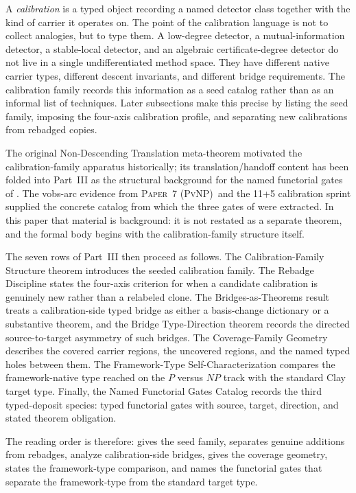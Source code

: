 \documentclass[11pt]{article}
\newcommand{\PaperPvNP}{\textsc{Paper~7 (PvNP)}}
\newcommand{\fourAxis}{four-axis calibration profile}
\newcommand{\TDS}{typed-deposit species}
\newcommand{\TypedBridgeCalibration}{calibration-side typed bridge}
\theoremstyle{definition}
\begin{document}
A \emph{calibration} is a typed object recording a named detector class
together with the kind of carrier it operates on.  The point of the
calibration language is not to collect analogies, but to type them.  A
low-degree detector, a mutual-information detector, a stable-local
detector, and an algebraic certificate-degree detector do not live in a
single undifferentiated method space.  They have different native carrier
types, different descent invariants, and different bridge requirements.
The calibration family records this information as a seed catalog rather
than as an informal list of techniques.  Later subsections make this
precise by listing the seed family, imposing the \fourAxis, and separating
new calibrations from rebadged copies.

The original Non-Descending Translation meta-theorem motivated the
calibration-family apparatus historically; its translation/handoff content
has been folded into Part~III as the structural background for the named
functorial gates of .  The
vobs-arc evidence from \PaperPvNP\ and the 11+5 calibration sprint
supplied the concrete catalog from which the three gates of
 were extracted.  In this
paper that material is background: it is
not restated as a separate theorem, and the formal body begins with the
calibration-family structure itself.

The seven rows of Part~III then proceed as follows.  The
Calibration-Family Structure theorem introduces the seeded calibration
family.  The Rebadge Discipline states the four-axis criterion for
when a candidate calibration is genuinely new rather than a relabeled
clone.  The Bridges-as-Theorems result treats a
\TypedBridgeCalibration{} as either a basis-change dictionary or a
substantive theorem, and the Bridge Type-Direction theorem records the
directed source-to-target asymmetry of such bridges.  The
Coverage-Family Geometry describes the covered carrier regions, the
uncovered regions, and the named typed holes between them.  The
Framework-Type Self-Characterization compares the framework-native
type reached on the \(P\) versus \(NP\) track with the standard Clay
target type.  Finally, the Named Functorial Gates Catalog records the
third \TDS{}: typed functorial gates with source, target, direction,
and stated theorem obligation.

The reading order is therefore:
 gives the seed family,
 separates genuine additions from
rebadges,
analyze calibration-side bridges,
 gives the coverage
geometry,  states the
framework-type comparison, and
 names the functorial gates
that separate the framework-type from the standard target type.
\end{document}
